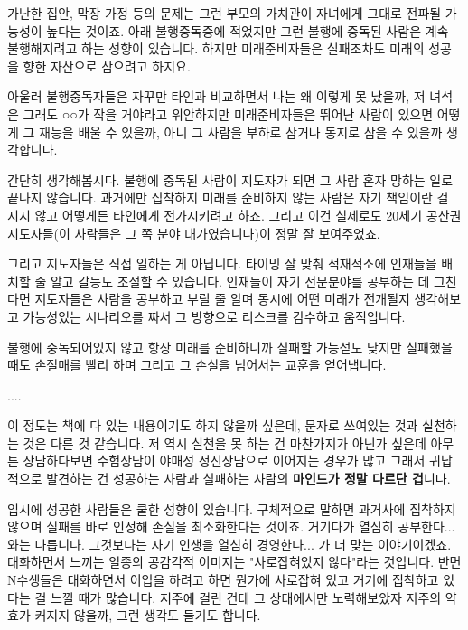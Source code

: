 \vspace{5mm}

가난한 집안, 막장 가정 등의 문제는 그런 부모의 가치관이 자녀에게 그대로 전파될 가능성이 높다는 것이죠.
아래 불행중독증에 적었지만 그런 불행에 중독된 사람은 계속 불행해지려고 하는 성향이 있습니다.
하지만 미래준비자들은 실패조차도 미래의 성공을 향한 자산으로 삼으려고 하지요.
\vspace{5mm}

아울러 불행중독자들은 자꾸만 타인과 비교하면서 나는 왜 이렇게 못 났을까, 저 녀석은 그래도 ○○가 작을 거야라고 위안하지만
미래준비자들은 뛰어난 사람이 있으면 어떻게 그 재능을 배울 수 있을까, 아니 그 사람을 부하로 삼거나 동지로 삼을 수 있을까 생각합니다.
\vspace{5mm}

간단히 생각해봅시다.
불행에 중독된 사람이 지도자가 되면 그 사람 혼자 망하는 일로 끝나지 않습니다.
과거에만 집착하지 미래를 준비하지 않는 사람은 자기 책임이란 걸 지지 않고 어떻게든 타인에게 전가시키려고 하죠.
그리고 이건 실제로도 20세기 공산권 지도자들(이 사람들은 그 쪽 분야 대가였습니다)이 정말 잘 보여주었죠.
\vspace{5mm}

그리고 지도자들은 직접 일하는 게 아닙니다. 타이밍 잘 맞춰 적재적소에 인재들을 배치할 줄 알고 갈등도 조절할 수 있습니다.
인재들이 자기 전문분야를 공부하는 데 그친다면 지도자들은 사람을 공부하고 부릴 줄 알며
동시에 어떤 미래가 전개될지 생각해보고 가능성있는 시나리오를 짜서 그 방향으로 리스크를 감수하고 움직입니다.
\vspace{5mm}

불행에 중독되어있지 않고 항상 미래를 준비하니까 실패할 가능섣도 낮지만
실패했을 때도 손절매를 빨리 하며 그리고 그 손실을 넘어서는 교훈을 얻어냅니다.
\vspace{5mm}

....
\vspace{5mm}

이 정도는 책에 다 있는 내용이기도 하지 않을까 싶은데, 문자로 쓰여있는 것과 실천하는 것은 다른 것 같습니다.
저 역시 실천을 못 하는 건 마찬가지가 아닌가 싶은데
아무튼 상담하다보면 수험상담이 야매성 정신상담으로 이어지는 경우가 많고
그래서 귀납적으로 발견하는 건 성공하는 사람과 실패하는 사람의 \textbf{마인드가 정말 다르단 겁}니다.
\vspace{5mm}

입시에 성공한 사람들은 쿨한 성향이 있습니다. 구체적으로 말하면 과거사에 집착하지 않으며 실패를 바로 인정해 손실을 최소화한다는 것이죠.
거기다가 열심히 공부한다... 와는 다릅니다. 그것보다는 자기 인생을 열심히 경영한다... 가 더 맞는 이야기이겠죠.
대화하면서 느끼는 일종의 공감각적 이미지는 "사로잡혀있지 않다"라는 것입니다.
반면 N수생들은 대화하면서 이입을 하려고 하면 뭔가에 사로잡혀 있고 거기에 집착하고 있다는 걸 느낄 때가 많습니다.
저주에 걸린 건데 그 상태에서만 노력해보았자 저주의 약효가 커지지 않을까, 그런 생각도 들기도 합니다.
\vspace{5mm}

